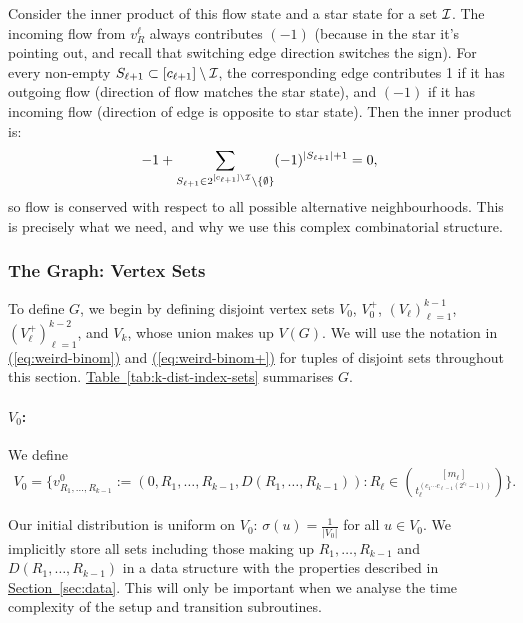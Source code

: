 \documentclass{theoretics}
\newcommand{\eq}[1]{\hyperref[eq:#1]{(\ref*{eq:#1})}}
\renewcommand{\sec}[1]{\hyperref[sec:#1]{Section~\ref*{sec:#1}}}
\newcommand{\tabl}[1]{\hyperref[tab:#1]{Table~\ref*{tab:#1}}}
\renewcommand{\>}{\rangle}
\newcommand{\<}{\langle}
\renewcommand{\(}{\left(}
\renewcommand{\)}{\right)}
\begin{document}
Consider the inner product of this flow state and a star state for a set ${\cal I}$. The incoming flow from $v_R^\ell$ always contributes $(-1)$ (because in the star it's pointing out, and recall that switching edge direction switches the sign). For every non-empty $S_{\ell+1}\subset [c_{\ell+1}]\setminus {\cal I}$, the corresponding edge
contributes 1 if it has outgoing flow (direction of flow matches the star state), and $(-1)$ if it has incoming flow (direction of edge is opposite to star state). 
Then the inner product is:
$$-1 + \sum_{S_{\ell+1}\in 2^{[c_{\ell+1}]\setminus{\cal I}}\setminus\{\emptyset\}}(-1)^{|S_{\ell+1}|+1} = 0,$$
so flow is conserved with respect to all possible alternative neighbourhoods. This is precisely what we need, and why we use this complex combinatorial structure.


\subsubsection{The Graph: Vertex Sets}\label{sec:k-dist-G-vertices}

To define $G$, we begin by defining disjoint vertex sets $V_0$, $V_0^+$, $(V_{\ell})_{\ell=1}^{k-1}$, $(V_{\ell}^+)_{\ell=1}^{k-2}$, and $V_k$, whose union makes up $V(G)$. We will use the notation in \eq{weird-binom} and \eq{weird-binom+} for tuples of disjoint sets throughout this section. \tabl{k-dist-index-sets} summarises $G$.






\paragraph{$V_0$:} We define
\begin{multline}
	V_0=\Bigg\{v^0_{R_1,\dots,R_{k-1}}:=(0,R_1,\dots,R_{k-1},D(R_1,\dots,R_{k-1})): R_{\ell} \in \binom{[m_{\ell}]}{t_{\ell}^{(c_1\cdots c_{\ell-1}(2^{c_{\ell}}-1))}}\Bigg\}.\label{eq:k-dist-V1}
\end{multline}


Our initial distribution is uniform on $V_0$: $\sigma(u)=\frac{1}{|V_0|}$ for all $u\in V_0$. We implicitly store all sets including those making up $R_1,\dots,R_{k-1}$ and $D(R_1,\dots,R_{k-1})$ in a data structure with the properties described in \sec{data}. This will only be important when we analyse the time complexity of the setup and transition subroutines. 
\end{document}
